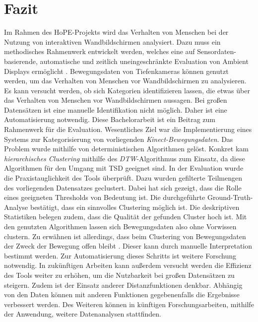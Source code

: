 \chapter{Fazit}
\label{chapter7}
Im Rahmen des HoPE-Projekts wird das Verhalten von Menschen
bei der Nutzung von interaktiven Wandbildschirmen analysiert.
Dazu muss ein methodisches Rahmenwerk entwickelt werden, welches eine auf Sensordaten-basierende,
automatische und zeitlich uneingeschränkte Evaluation von Ambient Displays ermöglicht \citep{unibw_honeypot-effekt_2021}.
Bewegungsdaten von Tiefenkameras können genutzt werden,
um das Verhalten von Menschen vor Wandbildschirmen zu analysieren.
Es kann versucht werden, ob sich Kategorien identifizieren lassen,
die etwas über das Verhalten von Menschen vor Wandbildschirmen aussagen.
Bei großen Datensätzen ist eine manuelle Identifikation nicht möglich.
Daher ist eine Automatisierung notwendig.
Diese Bachelorarbeit ist ein Beitrag zum Rahmenwerk für die Evaluation.
Wesentliches Ziel war die Implementierung eines Systems zur Kategorisierung von vorliegenden \emph{Kinect-Bewegungsdaten}.
Das Problem wurde mithilfe von deterministischen Algorithmen gelöst.
Konkret kam \emph{hierarchisches Clustering} mithilfe des \emph{\ac{DTW}}-Algorithmus zum Einsatz,
da diese Algorithmen für den Umgang mit \ac{TSD} geeignet sind.
In der Evaluation wurde die Praxistauglichkeit des Tools überprüft.
Dazu wurden gefilterte Teilmengen des vorliegenden Datensatzes geclustert.
Dabei hat sich gezeigt, dass die Rolle eines geeigneten Thresholds von Bedeutung ist.
Die durchgeführte Ground-Truth-Analyse bestätigt, dass ein sinnvolles Clustering möglich ist.
Die deskriptiven Statistiken belegen zudem, dass die Qualität der gefunden Cluster hoch ist.
Mit den genutzten Algorithmen lassen sich Bewegungsdaten also ohne Vorwissen clustern.
Zu erwähnen ist allerdings, dass beim Clustering von Bewegungsdaten
der Zweck der Bewegung offen bleibt \citep{monastero_traces_2018}.
Dieser kann durch manuelle Interpretation bestimmt werden.
Zur Automatisierung dieses Schritts ist weitere Forschung notwendig.
In zukünftigen Arbeiten kann außerdem versucht werden die Effizienz des Tools weiter zu erhöhen,
um die Nutzbarkeit bei großen Datensätzen zu steigern.
Zudem ist der Einsatz anderer Distanzfunktionen denkbar.
Abhängig von den Daten können mit anderen Funktionen gegebenenfalls die Ergebnisse verbessert werden.
Des Weiteren können in künftigen Forschungsarbeiten, mithilfe der Anwendung, weitere Datenanalysen stattfinden.